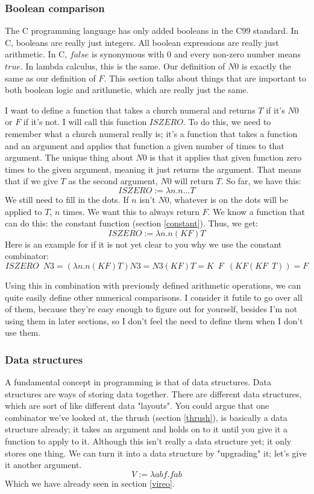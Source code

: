 \documentclass[11pt]{article}
\begin{document}
\subsubsection{Boolean comparison}\label{boolean_comparison}

The C programming language has only added booleans in the C99 standard. In C,
booleans are really just integers. All boolean expressions are really just
arithmetic. In C, \(false\) is synonymous with \(0\) and every non-zero number
means \(true\). In lambda calculus, this is the same. Our definition of \(N0\)
is exactly the same as our definition of \(F\). This section talks about things
that are important to both boolean logic and arithmetic, which are really just
the same.

I want to define a function that takes a church numeral and returns \(T\) if
it's \(N0\) or \(F\) if it's not. I will call this function \(ISZERO\). To do
this, we need to remember what a church numeral really is; it's a function that
takes a function and an argument and applies that function a given number of
times to that argument. The unique thing about \(N0\) is that it applies that
given function zero times to the given argument, meaning it just returns the
argument. That means that if we give \(T\) as the second argument, \(N0\) will
return \(T\). So far, we have this:
\[ISZERO:=\lambda n.n...T\]
We still need to fill in the dots. If \(n\) isn't \(N0\), whatever is on the
dots will be applied to \(T\), \(n\) times. We want this to always return
\(F\). We know a function that can do this: the constant function (section
\ref{constant}). Thus, we get:
\[ISZERO:=\lambda n.n(KF)T\]
Here is an example for if it is not yet clear to you why we use the constant
combinator:
\[ISZERO\enspace N3=(\lambda n.n(KF)T)N3=N3(KF)T=K\enspace F\enspace (KF(KF\enspace T))=F\]

Using this in combination with previously defined arithmetic operations, we can
quite easily define other numerical comparisons. I consider it futile to go
over all of them, because they're easy enough to figure out for yourself,
besides I'm not using them in later sections, so I don't feel the need to
define them when I don't use them.

\subsubsection{Data structures}\label{pairs}

A fundamental concept in programming is that of data structures. Data
structures are ways of storing data together. There are different data
structures, which are sort of like different data "layouts". You could argue
that one combinator we've looked at, the thrush (section \ref{thrush}), is
basically a data structure already; it takes an argument and holds on to it
until you give it a function to apply to it. Although this isn't really a data
structure yet; it only stores one thing. We can turn it into a data structure
by "upgrading" it; let's give it another argument.
\[V:=\lambda abf.fab\]
Which we have already seen in section \ref{vireo}.
\end{document}

